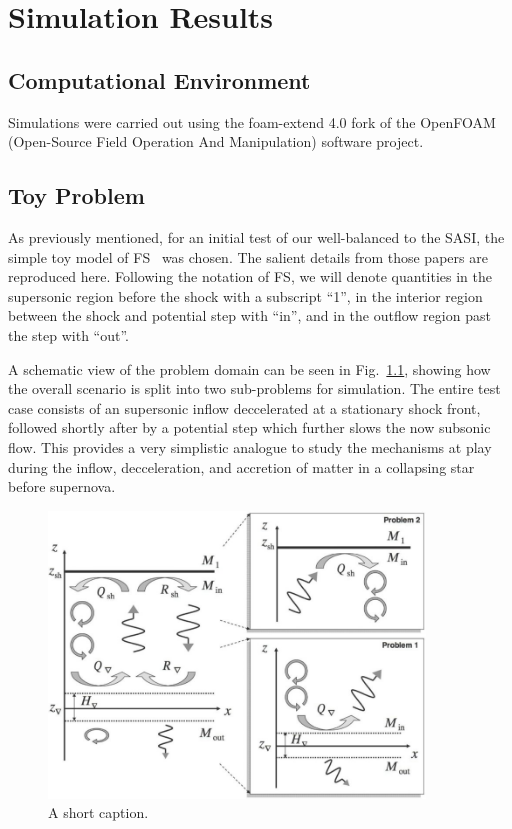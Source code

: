 \chapter{Simulation Results}

\section{Computational Environment}
\label{sec:environment}

Simulations were carried out using the foam-extend 4.0 fork of the OpenFOAM (Open-Source Field Operation And Manipulation) software project.


\section{Toy Problem}
\label{sec:toyProblem}

As previously mentioned, for an initial test of our well-balanced  to the SASI, the simple toy model of FS~\cite{Foglizzo2009,Sato2009} was chosen. The salient details from those papers  are reproduced here. Following the notation of FS, we will denote quantities in the supersonic region before the shock with a subscript ``1'', in the interior region between the shock and potential step with ``in'', and in the outflow region past the step with ``out''.

A schematic view of the problem domain can be seen in Fig.~\ref{fig:Sato1}, showing how the overall scenario is split into two sub-problems for simulation. The entire test case consists of an supersonic inflow deccelerated at a stationary shock front, followed shortly after by a potential step which further slows the now subsonic flow. This provides a very simplistic analogue to study the mechanisms at play during the inflow, decceleration, and accretion of matter in a collapsing star before supernova.

\begin {figure}
\centering
\includegraphics[width=10cm]{figures/Sato1}
\caption {A short caption.}
\label{fig:Sato1}
\end{figure}

